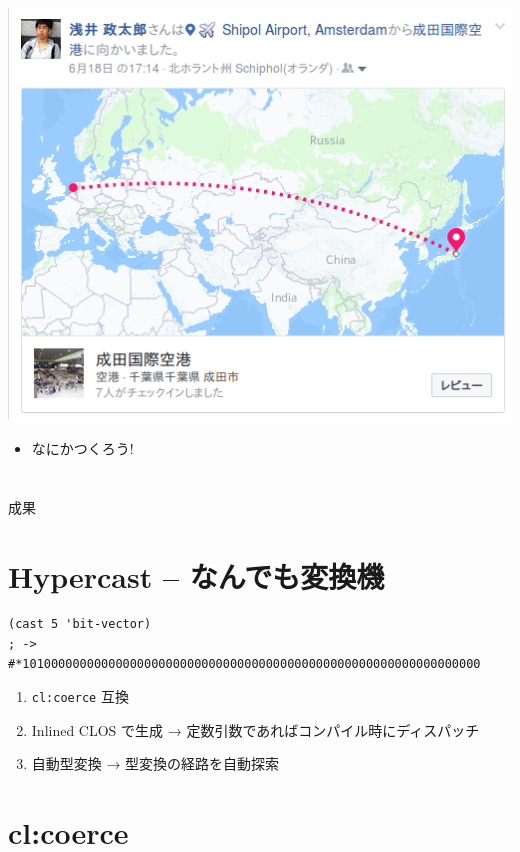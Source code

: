 \includegraphics{img/static/flight.png}

\begin{xlarge}
\begin{alignright}
\begin{itemize}
\item なにかつくろう!
\end{itemize}
\end{alignright}
\end{xlarge}

\section{}
\label{sec-4}

\begin{xlarge}
\begin{center}
成果
\end{center}
\end{xlarge}

\section{Hypercast -- なんでも変換機}
\label{sec-5}

\begin{larger}
\begin{verbatim}
(cast 5 'bit-vector)
; -> #*1010000000000000000000000000000000000000000000000000000000000000
\end{verbatim}
\end{larger}

\begin{enumerate}
\item \texttt{cl:coerce} 互換
\item Inlined CLOS で生成 → 定数引数であればコンパイル時にディスパッチ
\item 自動型変換 → 型変換の経路を自動探索
\end{enumerate}

\section{cl:coerce}
\label{sec-6}
